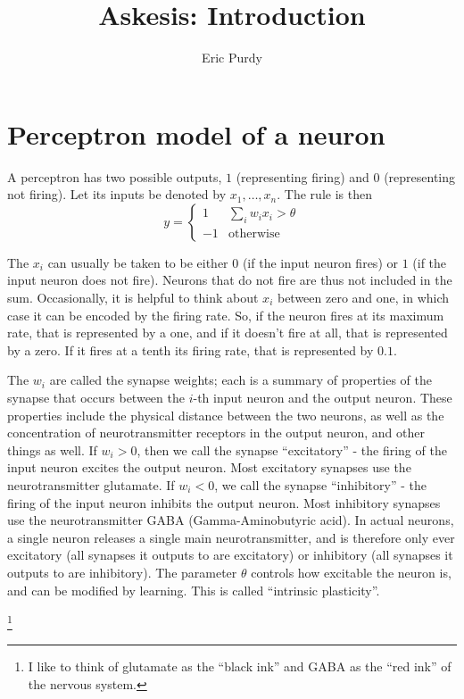 \documentclass{article}
\title{Askesis: Introduction} \author{Eric Purdy}
\theoremstyle{definition}
\begin{document}
\maketitle

\section{Perceptron model of a neuron}

A perceptron has two possible outputs, $1$ (representing firing) and
$0$ (representing not firing). Let its inputs be denoted by $x_1,
\dots, x_n$. The rule is then
$$y = \begin{cases} 1 & \sum_i w_i x_i > \theta \\ -1 & \mbox{otherwise}  
\end{cases}$$

The $x_i$ can usually be taken to be either $0$ (if the input neuron
fires) or $1$ (if the input neuron does not fire). Neurons that do not
fire are thus not included in the sum. Occasionally, it is helpful to
think about $x_i$ between zero and one, in which case it can be
encoded by the firing rate. So, if the neuron fires at its maximum
rate, that is represented by a one, and if it doesn't fire at all,
that is represented by a zero. If it fires at a tenth its firing rate,
that is represented by $0.1$.

The $w_i$ are called the synapse weights; each is a summary of
properties of the synapse that occurs between the $i$-th input neuron
and the output neuron. These properties include the physical distance
between the two neurons, as well as the concentration of
neurotransmitter receptors in the output neuron, and other things as
well. If $w_i > 0$, then we call the synapse ``excitatory'' - the
firing of the input neuron excites the output neuron. Most excitatory
synapses use the neurotransmitter glutamate. If $w_i < 0$, we call the
synapse ``inhibitory'' - the firing of the input neuron inhibits the
output neuron. Most inhibitory synapses use the neurotransmitter GABA
(Gamma-Aminobutyric acid). In actual neurons, a single neuron releases
a single main neurotransmitter, and is therefore only ever excitatory
(all synapses it outputs to are excitatory) or inhibitory (all
synapses it outputs to are inhibitory). The parameter $\theta$
controls how excitable the neuron is, and can be modified by
learning. This is called ``intrinsic plasticity''.

\footnote{I like to think of glutamate as the ``black ink'' and GABA as the
  ``red ink'' of the nervous system.}
\end{document}
